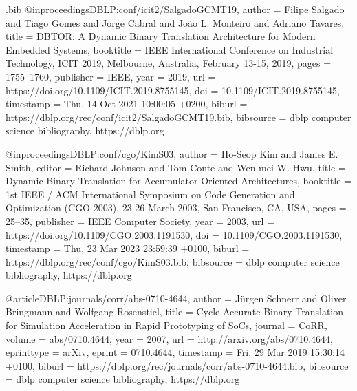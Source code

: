 \begin{filecontents}{\jobname.bib}
@inproceedings{DBLP:conf/icit2/SalgadoGCMT19,
  author       = {Filipe Salgado and
                  Tiago Gomes and
                  Jorge Cabral and
                  Jo{\~{a}}o L. Monteiro and
                  Adriano Tavares},
  title        = {{DBTOR:} {A} Dynamic Binary Translation Architecture for Modern Embedded
                  Systems},
  booktitle    = {{IEEE} International Conference on Industrial Technology, {ICIT} 2019,
                  Melbourne, Australia, February 13-15, 2019},
  pages        = {1755--1760},
  publisher    = {{IEEE}},
  year         = {2019},
  url          = {https://doi.org/10.1109/ICIT.2019.8755145},
  doi          = {10.1109/ICIT.2019.8755145},
  timestamp    = {Thu, 14 Oct 2021 10:00:05 +0200},
  biburl       = {https://dblp.org/rec/conf/icit2/SalgadoGCMT19.bib},
  bibsource    = {dblp computer science bibliography, https://dblp.org}
}

@inproceedings{DBLP:conf/cgo/KimS03,
  author       = {Ho{-}Seop Kim and
                  James E. Smith},
  editor       = {Richard Johnson and
                  Tom Conte and
                  Wen{-}mei W. Hwu},
  title        = {Dynamic Binary Translation for Accumulator-Oriented Architectures},
  booktitle    = {1st {IEEE} / {ACM} International Symposium on Code Generation and
                  Optimization {(CGO} 2003), 23-26 March 2003, San Francisco, CA, {USA}},
  pages        = {25--35},
  publisher    = {{IEEE} Computer Society},
  year         = {2003},
  url          = {https://doi.org/10.1109/CGO.2003.1191530},
  doi          = {10.1109/CGO.2003.1191530},
  timestamp    = {Thu, 23 Mar 2023 23:59:39 +0100},
  biburl       = {https://dblp.org/rec/conf/cgo/KimS03.bib},
  bibsource    = {dblp computer science bibliography, https://dblp.org}
}

@article{DBLP:journals/corr/abs-0710-4644,
  author       = {J{\"{u}}rgen Schnerr and
                  Oliver Bringmann and
                  Wolfgang Rosenstiel},
  title        = {Cycle Accurate Binary Translation for Simulation Acceleration in Rapid
                  Prototyping of SoCs},
  journal      = {CoRR},
  volume       = {abs/0710.4644},
  year         = {2007},
  url          = {http://arxiv.org/abs/0710.4644},
  eprinttype    = {arXiv},
  eprint       = {0710.4644},
  timestamp    = {Fri, 29 Mar 2019 15:30:14 +0100},
  biburl       = {https://dblp.org/rec/journals/corr/abs-0710-4644.bib},
  bibsource    = {dblp computer science bibliography, https://dblp.org}
}


\end{filecontents}
